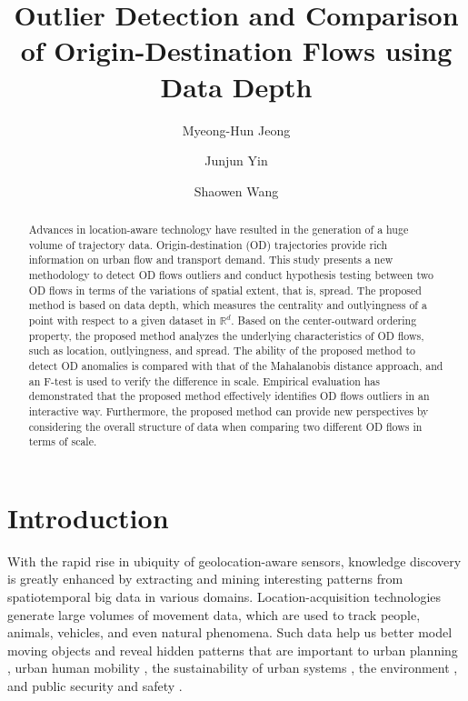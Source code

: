 \documentclass[a4paper,UKenglish]{lipics-v2018}
\title{Outlier Detection and Comparison of Origin-Destination Flows using Data Depth}
\author{Myeong-Hun Jeong}{Department of Civil Engineering, Chosun University, Gwangju, Republic of Korea}{mhjeong@chosun.ac.kr}{[orcid]}{[funding]}
\author{Junjun Yin}{Social Science Research Institute; Institute for CyberScience, Penn State University, PA, USA}{jyin@psu.edu}{[orcid]}{[funding]}
\author{Shaowen Wang}{Department of Geography and Geographic Information Science, University of Illinois at Urbana-Champaign, IL, USA}{shaowen@illinois.edu}{[orcid]}{[funding]}
\begin{document}
\maketitle

\begin{abstract}
Advances in location-aware technology have resulted in the generation of  a huge volume of trajectory data. Origin-destination (OD) trajectories provide rich information on urban flow and transport demand. This study presents a new methodology to detect OD flows outliers and conduct hypothesis testing between two OD flows in terms of the variations of spatial extent, that is, spread. The proposed method is based on data depth, which measures the centrality and outlyingness of a point with respect to a given dataset in $\mathbb{R}^d$. Based on the center-outward ordering property, the proposed method analyzes the underlying characteristics of OD flows, such as location, outlyingness, and  spread. The ability of the proposed method to detect OD anomalies is compared with that of the Mahalanobis distance approach, and an F-test is used to verify the difference in scale. Empirical evaluation has demonstrated that the proposed method effectively identifies  OD flows outliers in an interactive way. Furthermore, the proposed method  can provide new perspectives by considering the overall structure of data when comparing two different OD flows in terms of scale. 

 \end{abstract}

\section{Introduction}
With the rapid rise in ubiquity of geolocation-aware sensors, knowledge discovery is greatly enhanced by extracting and mining interesting patterns from spatiotemporal big data in various domains.
Location-acquisition technologies generate large volumes of movement data, which are used to track people, animals, vehicles, and even natural phenomena.
Such data help us better model moving objects and reveal hidden patterns that are important to urban planning \cite{mazimpaka15AGILE}, urban human mobility \cite{yin2017depicting,kwan1998space}, the sustainability of urban systems \cite{alberti2003integrating,chen13Percom}, the environment \cite{devarakonda13SIGKDD}, and public security and safety \cite{buchin14JOSIS}.
\end{document}

